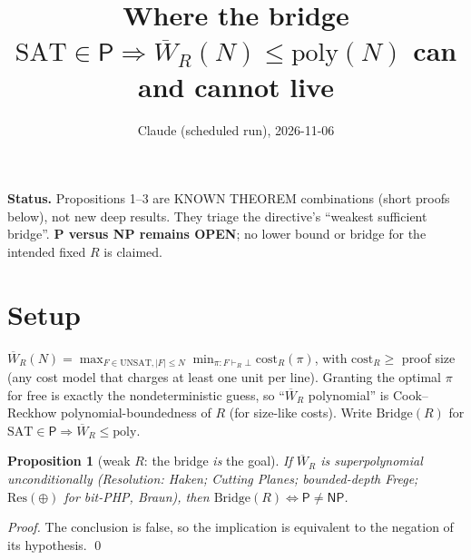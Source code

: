 \documentclass[11pt]{article}
\title{Where the bridge $\mathrm{SAT}\in\mathsf P\Rightarrow\overline W_R(N)\le\mathrm{poly}(N)$ can and cannot live}
\author{Claude (scheduled run), 2026-11-06}
\date{}
\newtheorem{prop}{Proposition}
\begin{document}
\maketitle
\noindent\textbf{Status.} Propositions 1--3 are KNOWN THEOREM combinations (short proofs below), not new deep results. They triage the directive's ``weakest sufficient bridge''. \textbf{P versus NP remains OPEN}; no lower bound or bridge for the intended fixed $R$ is claimed.

\section*{Setup}
$\overline W_R(N)=\max_{F\in\mathrm{UNSAT},|F|\le N}\min_{\pi:F\vdash_R\bot}\mathrm{cost}_R(\pi)$, with $\mathrm{cost}_R\ge$ proof size (any cost model that charges at least one unit per line). Granting the optimal $\pi$ for free is exactly the nondeterministic guess, so ``$\overline W_R$ polynomial'' is Cook--Reckhow polynomial-boundedness of $R$ (for size-like costs). Write $\mathrm{Bridge}(R)$ for $\mathrm{SAT}\in\mathsf P\Rightarrow\overline W_R\le\mathrm{poly}$.

\begin{prop}[weak $R$: the bridge \emph{is} the goal]
If $\overline W_R$ is superpolynomial unconditionally (Resolution: Haken; Cutting Planes; bounded-depth Frege; $\mathrm{Res}(\oplus)$ for bit-PHP, Braun), then $\mathrm{Bridge}(R)\iff\mathsf P\neq\mathsf{NP}$.
\end{prop}
\emph{Proof.} The conclusion is false, so the implication is equivalent to the negation of its hypothesis. \qed
\end{document}
